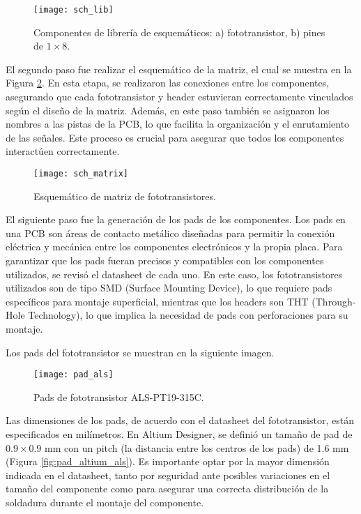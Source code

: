             \begin{figure}[hbtp]
                \centering
                \texttt{[image: sch\_lib]}
                \caption{Componentes de librería de esquemáticos: a) fototransistor, b) pines de $1\times 8$.}
                \label{fig:sch_lib}
            \end{figure}

El segundo paso fue realizar el esquemático de la matriz, el cual se muestra en la Figura \ref{fig:sch_matrix}. En esta etapa, se realizaron las conexiones entre los componentes, asegurando que cada fototransistor y header estuvieran correctamente vinculados según el diseño de la matriz. Además, en este paso también se asignaron los nombres a las pistas de la PCB, lo que facilita la organización y el enrutamiento de las señales. Este proceso es crucial para asegurar que todos los componentes interactúen correctamente.
            \begin{figure}[hbtp]
                \centering
                \texttt{[image: sch\_matrix]}
                \caption{Esquemático de matriz de fototransistores.}
                \label{fig:sch_matrix}
            \end{figure}
            
El siguiente paso fue la generación de los pads de los componentes. Los pads en una PCB son áreas de contacto metálico diseñadas para permitir la conexión eléctrica y mecánica entre los componentes electrónicos y la propia placa. Para garantizar que los pads fueran precisos y compatibles con los componentes utilizados, se revisó el datasheet de cada uno. En este caso, los fototransistores utilizados son de tipo SMD (Surface Mounting Device), lo que requiere pads específicos para montaje superficial, mientras que los headers son THT (Through-Hole Technology), lo que implica la necesidad de pads con perforaciones para su montaje.


Los pads del fototransistor se muestran en la siguiente imagen.

            \begin{figure}[hbtp]
                \centering
                \texttt{[image: pad\_als]}
                \caption{Pads de fototransistor ALS-PT19-315C.}
                \label{fig:pad_als}
            \end{figure}

Las dimensiones de los pads, de acuerdo con el datasheet del fototransistor, están especificados en milímetros. En Altium Designer, se definió un tamaño de pad de $0.9 \times 0.9$ mm con un pitch (la distancia entre los centros de los pads) de 1.6 mm (Figura \ref{fig:pad_altium_als}). Es importante optar por la mayor dimensión indicada en el datasheet, tanto por seguridad ante posibles variaciones en el tamaño del componente como para asegurar una correcta distribución de la soldadura durante el montaje del componente.

